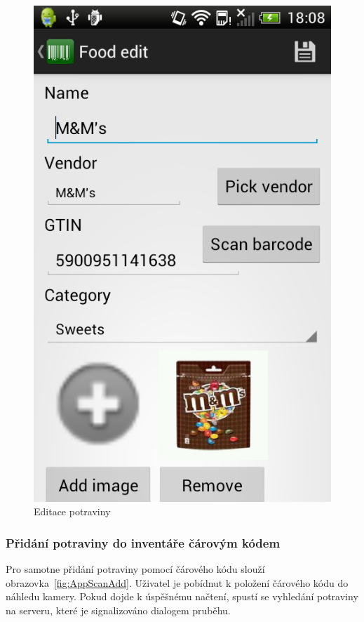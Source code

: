 \documentclass[thesis=B,czech]{FITthesis}[2013/10/20]
\begin{document}
\begin{figure}[H]
  \centering
  \includegraphics[scale=0.35]{screenshots/app_food_edit.png}
  \caption{Editace potraviny}
  \label{fig:AppFoodEdit}
\end{figure}

\clearpage

\subsubsection{Přidání potraviny do inventáře čárovým kódem}

Pro samotne přidání potraviny pomocí čárového kódu slouží obrazovka~\ref{fig:AppScanAdd}. Uživatel je pobídnut k položení čárového kódu do náhledu kamery. Pokud dojde k úspěšnému načtení, spustí se vyhledání potraviny na serveru, které je signalizováno dialogem pruběhu.
\end{document}
